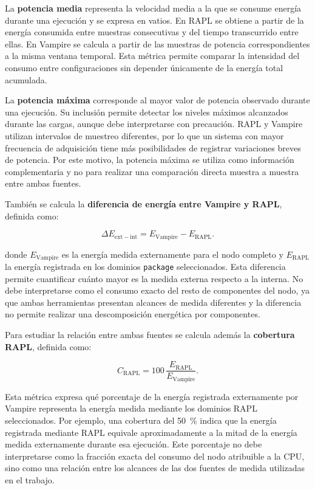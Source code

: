 La \textbf{potencia media} representa la velocidad media a la que se consume energía durante una ejecución y se expresa en vatios. En RAPL se obtiene a partir de la energía consumida entre muestras consecutivas y del tiempo transcurrido entre ellas. En Vampire se calcula a partir de las muestras de potencia correspondientes a la misma ventana temporal. Esta métrica permite comparar la intensidad del consumo entre configuraciones sin depender únicamente de la energía total acumulada.

La \textbf{potencia máxima} corresponde al mayor valor de potencia observado durante una ejecución. Su inclusión permite detectar los niveles máximos alcanzados durante las cargas, aunque debe interpretarse con precaución. RAPL y Vampire utilizan intervalos de muestreo diferentes, por lo que un sistema con mayor frecuencia de adquisición tiene más posibilidades de registrar variaciones breves de potencia. Por este motivo, la potencia máxima se utiliza como información complementaria y no para realizar una comparación directa muestra a muestra entre ambas fuentes.

También se calcula la \textbf{diferencia de energía entre Vampire y RAPL}, definida como:

\[
\Delta E_{\mathrm{ext-int}} =
E_{\mathrm{Vampire}} - E_{\mathrm{RAPL}}.
\]

donde \(E_{\mathrm{Vampire}}\) es la energía medida externamente para el nodo completo y \(E_{\mathrm{RAPL}}\) la energía registrada en los dominios \texttt{package} seleccionados. Esta diferencia permite cuantificar cuánto mayor es la medida externa respecto a la interna. No debe interpretarse como el consumo exacto del resto de componentes del nodo, ya que ambas herramientas presentan alcances de medida diferentes y la diferencia no permite realizar una descomposición energética por componentes.

Para estudiar la relación entre ambas fuentes se calcula además la \textbf{cobertura RAPL}, definida como:

\[
C_{\mathrm{RAPL}} =
100\,
\frac{E_{\mathrm{RAPL}}}
     {E_{\mathrm{Vampire}}}.
\]

Esta métrica expresa qué porcentaje de la energía registrada externamente por Vampire representa la energía medida mediante los dominios RAPL seleccionados. Por ejemplo, una cobertura del 50~\% indica que la energía registrada mediante RAPL equivale aproximadamente a la mitad de la energía medida externamente durante esa ejecución. Este porcentaje no debe interpretarse como la fracción exacta del consumo del nodo atribuible a la CPU, sino como una relación entre los alcances de las dos fuentes de medida utilizadas en el trabajo.

